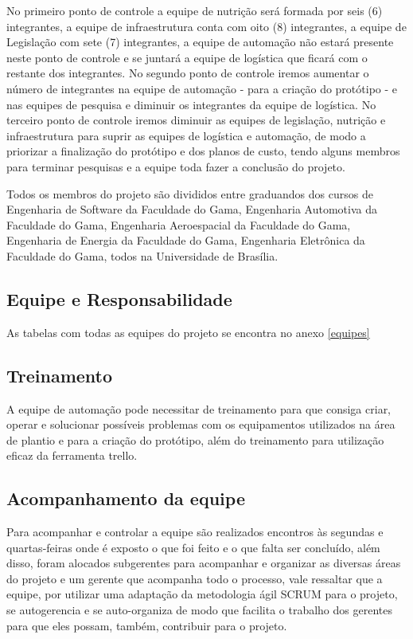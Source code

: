   No primeiro ponto de controle a equipe de nutrição será formada por seis (6) integrantes, a equipe de infraestrutura conta com oito (8)
  integrantes, a equipe de Legislação com sete (7) integrantes, a equipe de automação não estará presente neste ponto de controle e se
  juntará a equipe de logística que ficará com o restante dos integrantes. No segundo ponto de controle iremos aumentar o número de
  integrantes na equipe de automação - para a criação do protótipo - e nas equipes de pesquisa e diminuir os integrantes da equipe de
  logística. No terceiro ponto de controle iremos diminuir as equipes de legislação, nutrição e infraestrutura para suprir as equipes de
  logística e automação, de modo a priorizar a finalização do protótipo e dos planos de custo, tendo alguns membros para terminar pesquisas e a equipe toda fazer a conclusão do projeto.

  Todos os membros do projeto são divididos entre graduandos dos cursos de Engenharia de Software da Faculdade do Gama, Engenharia Automotiva da Faculdade do Gama, Engenharia Aeroespacial da Faculdade do Gama, Engenharia de Energia da Faculdade do Gama, Engenharia Eletr\^{o}nica da Faculdade do Gama, todos na Universidade de Brasília.

\subsection{Equipe e Responsabilidade}

  As tabelas com todas as equipes do projeto se encontra no anexo \ref{equipes}

\subsection{Treinamento}

  A equipe de automação pode necessitar de treinamento para que consiga criar, operar e solucionar possíveis problemas com os equipamentos
  utilizados na área de plantio e para a criação do protótipo, além do treinamento para utilização eficaz da ferramenta trello.

\subsection{Acompanhamento da equipe}

  Para acompanhar e controlar a equipe são realizados encontros às segundas e quartas-feiras onde é exposto o que foi feito e o
  que falta ser concluído, além disso, foram alocados subgerentes para acompanhar e organizar as diversas áreas do projeto e um gerente
  que acompanha todo o processo, vale ressaltar que a equipe, por utilizar uma adaptação da metodologia ágil SCRUM para o projeto, se
  autogerencia e se auto-organiza de modo que facilita o trabalho dos gerentes para que eles possam, também, contribuir para o projeto.
